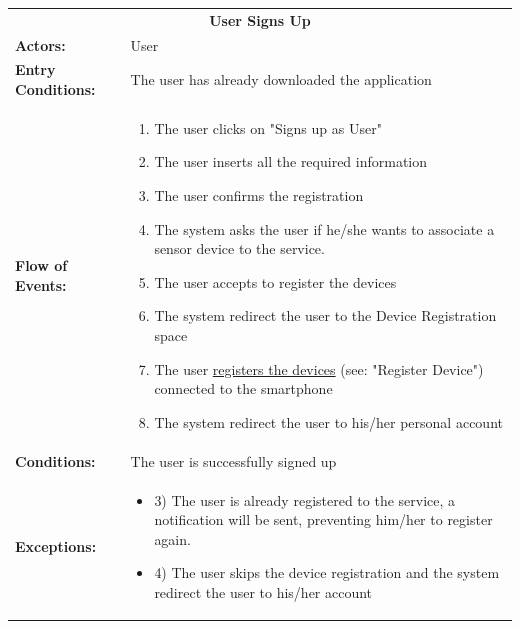 \begin{table}[htb]
	\centering
	{\renewcommand{\arraystretch}{2}%
		\begin{tabular}{|@{\hspace{2em}} p{4cm} @{}| p{11cm} @{\qquad}| }
			\cline{1-2}
			\multicolumn{2}{|c|}{\textbf{User Signs Up}} \\ \cline{1-2}
			\textbf{Actors:} & User \\ \cline{1-2}
			\textbf{Entry Conditions:} & The user has already downloaded the application \\ \cline{1-2}
			\textbf{Flow of Events:} & 
			\begin{enumerate}[itemsep=-0.2em, topsep=0em]
				\item The user clicks on "Signs up as User"
				\item The user inserts all the required information
				\item The user confirms the registration
				\item The system asks the user if he/she wants to 
				associate a sensor device to the service.
				\item The user accepts to register the devices
				\item The system redirect the user to the Device Registration space
				\item The user \underline{registers the devices} (see: "Register Device") connected to the smartphone
				\item The system redirect the user to his/her personal account
			\end{enumerate}\\ \cline{1-2}
			\textbf{ Conditions:} & The user is successfully signed up\\ \cline{1-2}
			\textbf{Exceptions:} & 
			\begin{itemize}[itemsep=-0.2em, topsep=0em]
				\item 3) The user is already registered to the service, a notification will be sent, preventing him/her to register again.
				\item 4) The user skips the device registration and the system redirect the user to his/her account
			\end{itemize} \\ \cline{1-2}
	\end{tabular}} \quad
\end{table}

